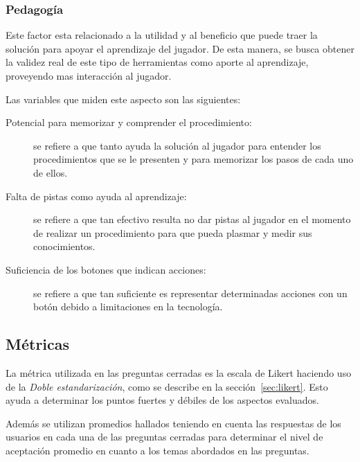 \subsubsection{Pedagogía}
\label{sec:sub_pedagogia}

Este factor esta relacionado a la utilidad y al beneficio que puede traer la
solución para apoyar el aprendizaje del jugador. De esta manera, se busca
obtener la validez real de este tipo de herramientas como aporte al aprendizaje,
proveyendo mas interacción al jugador.

Las variables que miden este aspecto son las siguientes:

\begin{description}

\item[Potencial para memorizar y comprender el procedimiento:] se refiere a
    que tanto ayuda la solución al jugador para entender los procedimientos que se
    le presenten y para memorizar los pasos de cada uno de ellos.

\item[Falta de pistas como ayuda al aprendizaje:] se refiere a que tan efectivo
    resulta no dar pistas al jugador en el momento de realizar un procedimiento
    para que pueda plasmar y medir sus conocimientos.

\item[Suficiencia de los botones que indican acciones:] se refiere a que tan
    suficiente es representar determinadas acciones  con un botón debido a
    limitaciones en la tecnología.

\end{description}


\subsection{Métricas}

La métrica utilizada en las preguntas cerradas es la escala de Likert haciendo
uso de la \emph{Doble estandarización}, como se describe en la
sección~\ref{sec:likert}. Esto ayuda a determinar los puntos fuertes y débiles
de los aspectos evaluados.

Además se utilizan promedios hallados teniendo en cuenta las respuestas de los
usuarios en cada una de las preguntas cerradas para determinar el nivel de
aceptación promedio en cuanto a los temas abordados en las preguntas.



